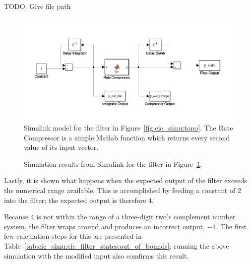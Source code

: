 TODO: Give file path

\begin{figure}
    \centering
    \includegraphics[width=\textwidth]{images/cicSimu/simulink.png}
    \caption[Simulink Filter Model]{%
        Simulink model  for the filter  in Figure~\ref{fig:cic_simu:topo}. The
        Rate   Compressor is  a  simple Matlab  function  which returns  every
        second value of its input vector.%
    }
    \label{fig:cic_simu:simulink_model}
\end{figure}

\begin{figure}
    \centering
    
    \caption[Simulink Simulation Results]{%
        Simulation    results    from    Simulink   for    the    filter    in
        Figure~\ref{fig:cic_simu:simulink_model}.%
    }
    \label{fig:cic_simu:simulink_results}
\end{figure}

Lastly,  it is  shown what  happens  when the  expected output  of the  filter
exceeds  the numerical  range  available. This is  accomplished  by feeding  a
constant of \num{2} into the filter; the expected output is therefore \num{4}.

Because \num{4}  is not  within the  range of  a three-digit  two's complement
number  system, the  filter wraps  around  and produces  an incorrect  output,
\num{-4}.   The  first  few  calculation  steps  for  this  are  presented  in
Table~\ref{tab:cic_simu:cic_filter_states:out_of_bounds};  running  the  above
simulation with the modified input also comfirms this result.

